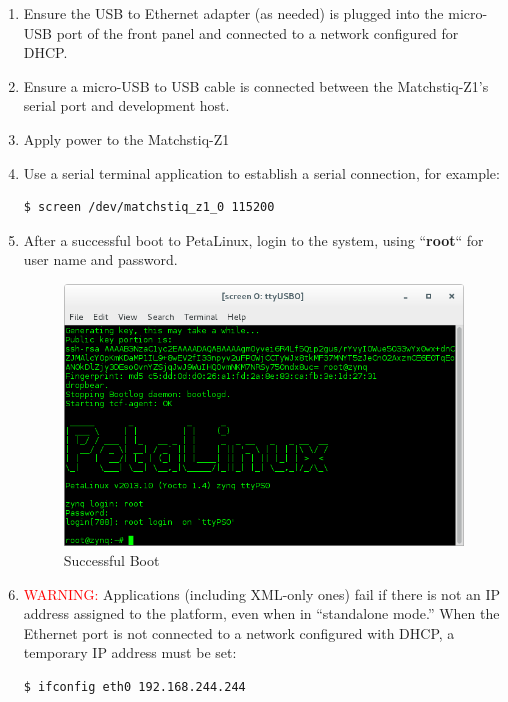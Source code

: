 \begin{enumerate}
\item Ensure the USB to Ethernet adapter (as needed) is plugged into the micro-USB port of the front panel and connected to a network configured for DHCP. \item Ensure a micro-USB to USB cable is connected between the Matchstiq-Z1's serial port and development host.
\item Apply power to the Matchstiq-Z1
\item Use a serial terminal application to establish a serial connection, for example:

\begin{verbatim}
$ screen /dev/matchstiq_z1_0 115200
\end{verbatim} \medskip

\item After a successful boot to PetaLinux, login to the system, using  ``\textbf{root}`` for user name and password.

\begin{figure}[H]
	\centerline{\includegraphics[scale=0.5]{Matchstiq_Z1_login}}
	\caption{Successful Boot}
	\label{fig:boot2}
\end{figure}

\item \textcolor{red}{WARNING:}
Applications (including XML-only ones) fail if there is not an IP address assigned to the platform, even when in ``standalone mode.'' When the Ethernet port is not connected to a network configured with DHCP, a temporary IP address must be set:
\begin{verbatim}
$ ifconfig eth0 192.168.244.244
\end{verbatim} \medskip


\end{enumerate}
